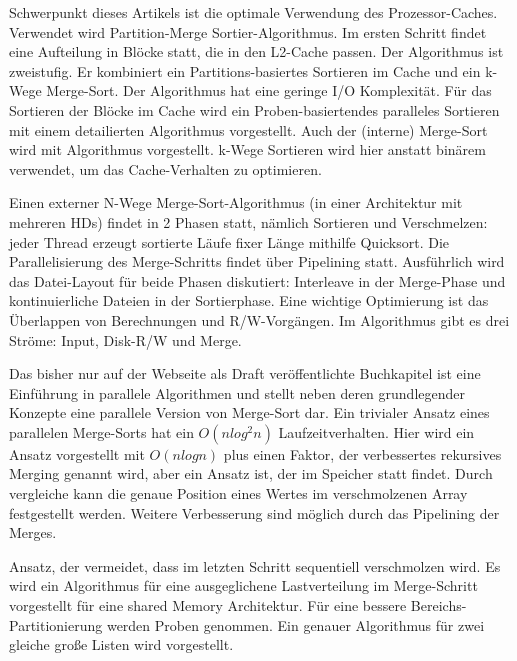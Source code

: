 \documentclass[a4paper,12pt,twoside]{article}
\begin{document}
Schwerpunkt dieses Artikels ist die optimale Verwendung des Prozessor-Caches. Verwendet wird Partition-Merge Sortier-Algorithmus. Im ersten Schritt findet eine Aufteilung in Blöcke statt, die in den L2-Cache passen. Der Algorithmus ist zweistufig. Er kombiniert ein Partitions-basiertes Sortieren im Cache und ein k-Wege Merge-Sort. Der Algorithmus hat eine geringe I/O Komplexität. Für das Sortieren der Blöcke im Cache wird ein Proben-basiertendes paralleles Sortieren mit einem detailierten Algorithmus vorgestellt. Auch der (interne) Merge-Sort wird mit Algorithmus vorgestellt. k-Wege Sortieren wird hier anstatt binärem verwendet, um das Cache-Verhalten zu optimieren.

\textbf{}

Einen externer N-Wege Merge-Sort-Algorithmus (in einer Architektur mit mehreren HDs) findet in 2 Phasen statt, nämlich Sortieren und Verschmelzen: jeder Thread erzeugt sortierte Läufe fixer Länge mithilfe Quicksort. Die Parallelisierung des Merge-Schritts findet über Pipelining statt. Ausführlich wird das Datei-Layout für beide Phasen diskutiert: Interleave in der Merge-Phase und kontinuierliche Dateien in der Sortierphase. Eine wichtige Optimierung ist das Überlappen von Berechnungen und R/W-Vorgängen. Im Algorithmus gibt es drei Ströme: Input, Disk-R/W und Merge. 

\textbf{}

Das bisher nur auf der Webseite als Draft veröffentlichte Buchkapitel ist eine Einführung in parallele Algorithmen und stellt neben deren grundlegender Konzepte eine parallele Version von Merge-Sort dar. Ein trivialer Ansatz eines parallelen Merge-Sorts hat ein $O(n log^{2} n)$ Laufzeitverhalten. Hier wird ein Ansatz vorgestellt mit $O(n log n)$ plus einen Faktor, der verbessertes rekursives Merging genannt wird, aber ein Ansatz ist, der im Speicher statt findet. Durch vergleiche kann die genaue Position eines Wertes im verschmolzenen Array festgestellt werden. Weitere Verbesserung sind möglich durch das Pipelining der Merges.

\textbf{}

Ansatz, der vermeidet, dass im letzten Schritt sequentiell verschmolzen wird. Es wird ein Algorithmus für eine ausgeglichene Lastverteilung im Merge-Schritt vorgestellt für eine shared Memory Architektur. Für eine bessere Bereichs-Partitionierung werden Proben genommen. Ein genauer Algorithmus für zwei gleiche große Listen wird vorgestellt. 
\end{document}
